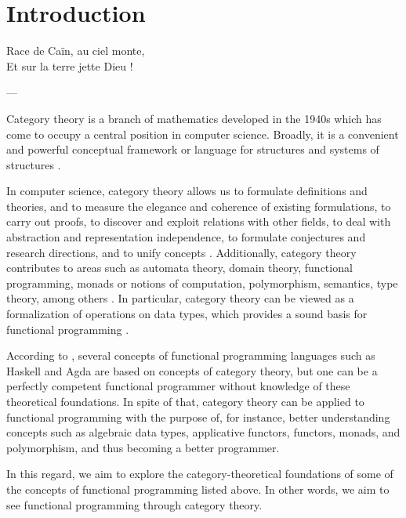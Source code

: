 \chapter{Introduction}
\label{chap:introduction}

\epigraph{
  Race de Caïn, au ciel monte,\\
  Et sur la terre jette Dieu !
}{---\textcite[16]{baudelaire-1857}}


Category theory is a branch of mathematics developed in the 1940s
which has come to occupy a central position in computer science.
Broadly, it is a convenient and powerful conceptual framework or
language for structures and systems of structures
\parencites[vii]{maclane-1998}[1]{marquis-2013}[1154]{wolfram-2002}.

In computer science, category theory allows us to formulate
definitions and theories, and to measure the elegance and coherence of
existing formulations, to carry out proofs, to discover and exploit
relations with other fields, to deal with abstraction and
representation independence, to formulate conjectures and research
directions, and to unify concepts \parencites[49--50]{goguen-1991}.
Additionally, category theory contributes to areas such as automata
theory, domain theory, functional programming, monads or notions of
computation, polymorphism, semantics, type theory, among others
\parencites[23]{marquis-2013}{nlab-category-theory}[xi]{pierce-1991}[415]{poigne-1992}.
In particular, category theory can be viewed as a formalization of
operations on data types, which provides a sound basis for functional
programming \parencites[414]{poigne-1992}[1154]{wolfram-2002}.

According to \textcite[73]{elkins-2009}, several concepts of
functional programming languages such as Haskell
\parencite{peytonjones-2003} and Agda \parencite{norell-2007} are
based on concepts of category theory, but one can be a perfectly
competent functional programmer without knowledge of these theoretical
foundations. In spite of that, category theory can be applied to
functional programming with the purpose of, for instance, better
understanding concepts such as algebraic data types, applicative
functors, functors, monads, and polymorphism, and thus becoming a
better programmer.

In this regard, we aim to explore the category-theoretical foundations
of some of the concepts of functional programming listed above. In
other words, we aim to see functional programming through category
theory.

